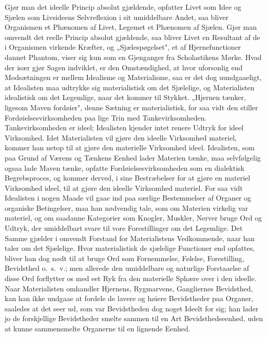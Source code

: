 \documentclass[12pt]{article}
\newcommand{\opage}[1]{\marginnote{\footnotesize\textit{[#1]}}}
\begin{document}
Gjør man det ideelle Princip absolut gjældende, opfatter Livet som
Idee og Sjælen som Livsideens Selvreflexion i sit umiddelbare Andet,
saa bliver Organismen et Phænomen af Livet, Legemet et Phænomen af
Sjælen. Gjør man omvendt det reelle Princip absolut gjældende, saa
bliver Livet en Resultant af de i Organismen virkende Kræfter, og
„Sjælespøgelset", et af Hjernefunctioner dannet Phantom, viser sig
kun som en Gjenganger fra Scholastikens Mørke. Hvad der især gjør
Sagen indviklet, er den Omstændighed, at hvor uforsonlig end
Modsætningen er mellem Idealisme og Materialisme, saa er det dog
uundgaaeligt, at Idealisten maa udtrykke sig materialistisk om det
Sjælelige, og Materialisten idealistisk om det Legemlige, naar det
kommer til Stykket. „Hjernen tænker, ligesom Maven fordøier", denne
Sætning er materialistisk, for saa vidt den stiller
Fordøielsesvirksomheden paa lige Trin med Tankevirksomheden.
Tankevirksomheden er ideel; Idealisten kjender intet renere Udtryk
for ideel Virksomhed. Idet Materialisten vil gjøre den ideelle
Virksomhed materiel, kommer han netop til at gjøre den materielle
Virksomhed ideel. Idealisten, som paa Grund af Værens og Tænkens
Eenhed lader Materien tænke, maa selvfølgelig ogsaa lade Maven
tænke, opfatte Fordøielsesvirksomheden som en dialektisk
Begrebsproces, og kommer derved, i sine Bestræbelser for at gjøre
\opage{52} en materiel Virksomhed ideel, til at gjøre den ideelle Virksomhed
materiel. For saa vidt Idealisten i nogen Maade vil gaae ind paa
særlige Bestemmelser af Organer og organiske Betingelser, maa han
nødvendig tale, som om Materien virkelig var materiel, og om
saadanne Kategorier som Knogler, Muskler, Nerver bruge Ord og
Udtryk, der umiddelbart svare til vore Forestillinger om det
Legemlige. Det Samme gjælder i omvendt Forstand for Materialistens
Vedkommende, naar han taler om det Sjælelige. Hvor materialistisk de
sjælelige Functioner end opfattes, bliver han dog nødt til at bruge
Ord som Fornemmelse, Følelse, Forestilling, Bevidsthed o.\ s.\ v.;
men allerede den umiddelbare og naturlige Forstaaelse af disse Ord
forflytter os med eet Ryk fra den materielle Sphære over i den
ideelle. Naar Materialisten omhandler Hjernens, Rygmarvens,
Gangliernes Bevidsthed, kan han ikke undgaae at fordele de lavere og
høiere Bevidstheder paa Organer, saaledes at det seer ud, som var
Bevidstheden dog noget Ideelt for sig; han lader jo de forskjellige
Bevidstheder smelte sammen til en Art Bevidsthedseenhed, uden at
kunne sammensmelte Organerne til en lignende Eenhed.
\end{document}
